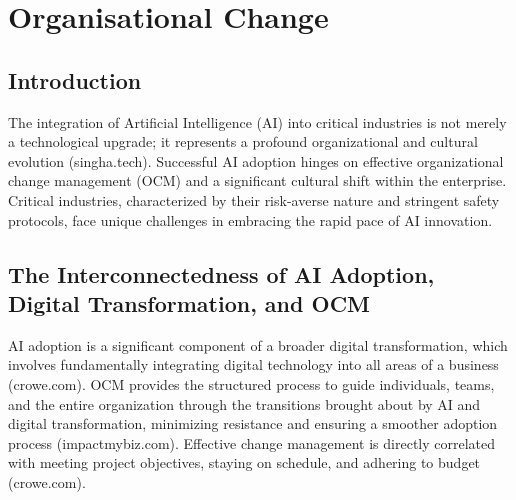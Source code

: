 \chapter{Organisational Change}
\section{Introduction}
The integration of Artificial Intelligence (AI) into critical industries is not merely a technological upgrade; it represents a profound organizational and cultural evolution (singha.tech). Successful AI adoption hinges on effective organizational change management (OCM) and a significant cultural shift within the enterprise. Critical industries, characterized by their risk-averse nature and stringent safety protocols, face unique challenges in embracing the rapid pace of AI innovation.

\section{The Interconnectedness of AI Adoption, Digital Transformation, and OCM}
AI adoption is a significant component of a broader digital transformation, which involves fundamentally integrating digital technology into all areas of a business (crowe.com). OCM provides the structured process to guide individuals, teams, and the entire organization through the transitions brought about by AI and digital transformation, minimizing resistance and ensuring a smoother adoption process (impactmybiz.com). Effective change management is directly correlated with meeting project objectives, staying on schedule, and adhering to budget (crowe.com).

